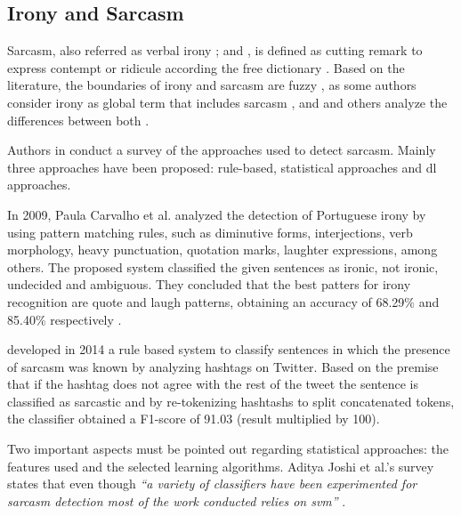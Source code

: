 \subsection{Irony and Sarcasm}
\label{subsec:irony_sarcasm}

Sarcasm, also referred as verbal irony \cite{giora2013negation}; \cite{giora2015defaultness} and \cite{giora2015default}, is defined as cutting remark to express contempt or ridicule according the free dictionary \cite{sarcasmFreeDictionary}. Based on the literature, the boundaries of irony and sarcasm are fuzzy \cite{bosco2013developing}, as some authors consider irony as global term that includes sarcasm \cite{gibbs1991psychological}, \cite{wilson2006pragmatics} and \cite{kreuz1993empirical} and others analyze the differences between both \cite{filatova2012irony}.

Authors in \cite{joshi2016automatic} conduct a survey of the approaches used to detect sarcasm. Mainly three approaches have been proposed: rule-based, statistical approaches and \acrlong{dl} approaches.

In 2009, Paula Carvalho et al. analyzed the detection of Portuguese irony by using pattern matching rules, such as diminutive forms, interjections, verb morphology, heavy punctuation, quotation marks, laughter expressions, among others. The proposed system classified the given sentences as ironic, not ironic, undecided and ambiguous. They concluded that the best patters for irony recognition are quote and laugh patterns, obtaining an accuracy of 68.29\% and 85.40\% respectively \cite{carvalho2009clues}.

\cite{maynard2014cares} developed in 2014 a rule based system to classify sentences in which the presence of sarcasm was known by analyzing hashtags on Twitter. Based on the premise that if the hashtag does not agree with the rest of the tweet the sentence is classified as sarcastic and by re-tokenizing hashtashs to split concatenated tokens, the classifier obtained a F1-score of 91.03 (result multiplied by 100).

Two important aspects must be pointed out regarding statistical approaches: the features used and the selected learning algorithms. Aditya Joshi et al.'s survey states that even though \textit{``a variety of classifiers have been experimented for sarcasm detection most of the work conducted relies on \acrshort{svm}''} \cite{joshi2016automatic}.

